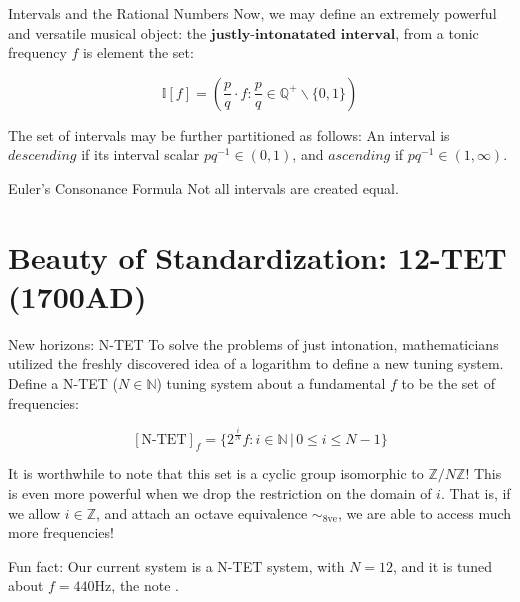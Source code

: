 \documentclass[usenames,dvipsnames]{beamer}
\newcommand{\N}{\mathbb{N}}
\newcommand{\Q}{\mathbb{Q}}
\newcommand{\Z}{\mathbb{Z}}
\newcommand{\octave}{\sim_{8\text{ve}}}
\newcommand{\Hz}{\text{Hz}}
\begin{document}
    
  \begin{frame}{Intervals and the Rational Numbers}
  Now, we may define an extremely powerful and versatile musical object: the $\textbf{justly-intonatated interval}$, from a tonic frequency $f$ is element the set: 
  
  $$ \mathbb{I}[f] = \left( \frac{p}{q} \cdot f : \frac{p}{q} \in \Q^+ \backslash \{0,1\} \right) $$
  
  The set of intervals may be further partitioned as follows:
  An interval is $\textit{descending}$ if its interval scalar $pq^{-1} \in (0,1)$, and $\textit{ascending}$ if $pq^{-1} \in (1,\infty)$.
  
  \end{frame}
  
  \begin{frame}{Euler's Consonance Formula}
  Not all intervals are created equal. 
  \end{frame}
  
  \section{Beauty of Standardization: 12-TET (1700AD)}
  
  \begin{frame}{New horizons: N-TET}
  To solve the problems of just intonation, mathematicians utilized the freshly discovered idea of a logarithm to define a new tuning system. Define a N-TET ($N \in \N$) tuning system about a fundamental $f$ to be the set of frequencies: 
  
  $$ [\text{N-TET}]_f = \{ 2^{\frac{i}{N}} f :  i \in \N \, | \, 0 \leq i \leq N-1 \}$$
  
  It is worthwhile to note that this set is a cyclic group isomorphic to $\Z/N\Z$! This is even more powerful when we drop the restriction on the domain of $i$. That is, if we allow $i \in \Z$, and attach an octave equivalence $\octave$, we are able to access much more frequencies!
  
  Fun fact: Our current system is a N-TET system, with $N = 12$, and it is tuned about $f = 440\Hz$, the note .
  \end{frame}
  
\end{document}

